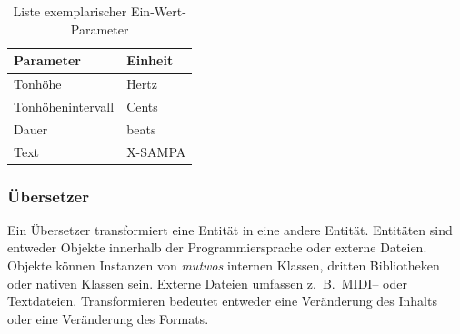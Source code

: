 \documentclass[12pt,a4paper,ngerman]{article}
\begin{document}
\begin{table}[h!]
    \begin{center}
        \begin{tabular}{l l} 
            \hline
            Parameter & Einheit \\ [0.5ex] 
            \hline\hline
            Tonhöhe & Hertz \\ 
            Tonhöhenintervall & Cents \\ 
            Dauer & beats \\ 
            Text & X-SAMPA\footnotemark \\ 
            \hline
        \end{tabular}
    \end{center}

    \caption{Liste exemplarischer Ein-Wert-Parameter}
\end{table}


\subsubsection{Übersetzer}

Ein Übersetzer transformiert eine Entität in eine andere Entität.
Entitäten sind entweder Objekte innerhalb der Programmiersprache oder externe Dateien.
Objekte können Instanzen von \emph{mutwos} internen Klassen, dritten Bibliotheken oder nativen Klassen sein.
Externe Dateien umfassen z.~B.\ MIDI-- oder Textdateien.
Transformieren bedeutet entweder eine Veränderung des Inhalts oder eine Veränderung des Formats.
\end{document}
